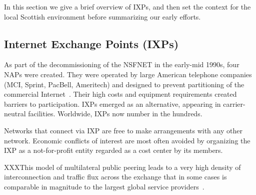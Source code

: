 In this section we give a brief overview of \acp{IXP}, and then set the context for the local Scottish environment before summarizing our early efforts.

\subsection{Internet Exchange Points (IXPs)}

As part of the decommissioning of the \ac{NSFNET} in the early-mid 1990s, four
\acp{NAP} were created. They were operated by large American telephone companies
(MCI, Sprint, PacBell, Ameritech) and designed to prevent partitioning of the
commercial Internet~\cite{hayes1997computing,Ager:2012}. Their high costs and equipment requirements created barriers to participation.
\acp{IXP} emerged as an alternative, appearing in carrier-neutral facilities. Worldwide, \acp{IXP} now number in the hundreds.

Networks that connect via \ac{IXP} are free to make arrangements with any other network. Economic conflicts of interest are most often avoided by organizing the \ac{IXP} as a not-for-profit entity regarded as a cost center by its members.

XXXThis model of multilateral public peering leads to a very high
density of interconnection and traffic flux across the exchange that
in some cases is comparable in magnitude to the largest global
service providers~\cite{Ager:2012}.



